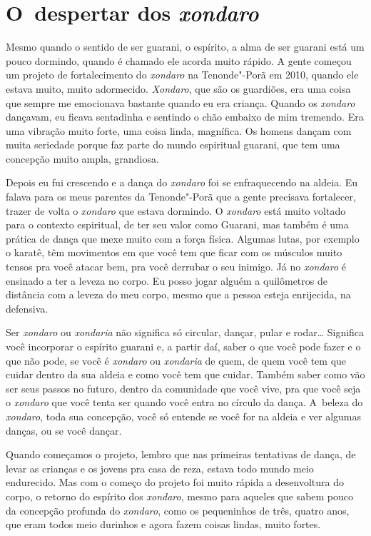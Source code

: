 \section{O~despertar dos \emph{xondaro}}

Mesmo quando o sentido de ser guarani, o espírito, a alma de ser guarani
está um pouco dormindo, quando é chamado ele acorda muito rápido. A
gente começou um projeto de fortalecimento do \emph{xondaro} na Tenonde"-Porã
em 2010, quando ele estava muito, muito adormecido. \emph{Xondaro}, que são os
guardiões, era uma coisa que sempre me emocionava bastante quando eu
era criança. Quando os \emph{xondaro} dançavam, eu ficava sentadinha e
sentindo o chão embaixo de mim tremendo. Era uma vibração muito forte,
uma coisa linda, magnífica. Os homens dançam com muita seriedade porque
faz parte do mundo espiritual guarani, que tem uma concepção muito
ampla, grandiosa.

Depois eu fui crescendo e a dança do \emph{xondaro} foi se enfraquecendo na
aldeia. Eu falava para os meus parentes da Tenonde"-Porã que a gente
precisava fortalecer, trazer de volta o \emph{xondaro} que estava dormindo. O
\emph{xondaro} está muito voltado para o contexto espiritual, de ter seu valor
como Guarani, mas também é uma prática de dança que mexe muito com a
força física. Algumas lutas, por exemplo o karatê, têm movimentos em
que você tem que ficar com os músculos muito tensos pra você atacar
bem, pra você derrubar o seu inimigo. Já no \emph{xondaro} é ensinado a ter a
leveza no corpo. Eu posso jogar alguém a quilômetros de distância com a
leveza do meu corpo, mesmo que a pessoa esteja enrijecida, na
defensiva.

Ser \emph{xondaro} ou \emph{xondaria} não significa só circular, dançar, pular e
rodar\ldots{} Significa você incorporar o espírito guarani e, a partir daí,
saber o que você pode fazer e o que não pode, se você é \emph{xondaro} ou
\emph{xondaria} de quem, de quem você tem que cuidar dentro da sua aldeia e
como você tem que cuidar. Também saber como vão ser seus passos no
futuro, dentro da comunidade que você vive, pra que você seja o \emph{xondaro}
que você tenta ser quando você entra no círculo da dança. A~beleza do
\emph{xondaro}, toda sua concepção, você só entende se você for na aldeia e
ver algumas danças, ou se você dançar.

Quando começamos o projeto, lembro que nas primeiras tentativas de
dança, de levar as crianças e os jovens pra casa de reza, estava todo
mundo meio endurecido. Mas com o começo do projeto foi muito rápida a
desenvoltura do corpo, o retorno do espírito dos \emph{xondaro}, mesmo para
aqueles que sabem pouco da concepção profunda do \emph{xondaro}, como os
pequeninhos de três, quatro anos, que eram todos meio durinhos e agora
fazem coisas lindas, muito fortes. 

